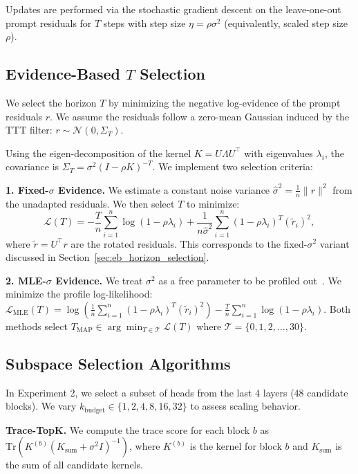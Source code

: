 \documentclass{article}
\theoremstyle{plain}
\theoremstyle{definition}
\theoremstyle{remark}
\begin{document}
Updates are performed via the stochastic gradient descent on the leave-one-out prompt residuals for $T$ steps with step size $\eta = \rho \sigma^2$ (equivalently, scaled step size $\rho$).

\subsection{Evidence-Based $T$ Selection}

We select the horizon $T$ by minimizing the negative log-evidence of the prompt residuals $r$. We assume the residuals follow a zero-mean Gaussian induced by the TTT filter: $r \sim \mathcal{N}(0, \Sigma_T)$.

Using the eigen-decomposition of the kernel $K = U \Lambda U^\top$ with eigenvalues $\lambda_i$, the covariance is $\Sigma_T = \sigma^2 (I - \rho K)^{-T}$. We implement two selection criteria:

\textbf{1. Fixed-$\sigma$ Evidence.} We estimate a constant noise variance $\hat{\sigma}^2 = \frac{1}{n}\|r\|^2$ from the unadapted residuals. We then select $T$ to minimize:
\begin{equation}
\mathcal{L}(T) = -\frac{T}{n} \sum_{i=1}^n \log(1 - \rho \lambda_i) + \frac{1}{n \hat{\sigma}^2} \sum_{i=1}^n (1 - \rho \lambda_i)^T (\tilde{r}_i)^2,
\end{equation}
where $\tilde{r} = U^\top r$ are the rotated residuals. This corresponds to the fixed-$\sigma^2$ variant discussed in Section~\ref{sec:eb_horizon_selection}.

\textbf{2. MLE-$\sigma$ Evidence.} We treat $\sigma^2$ as a free parameter to be profiled out~\citep{MurphyVanDerVaart2000Profile}. We minimize the profile log-likelihood: $\mathcal{L}_{\text{MLE}}(T) =
\log\left( \frac{1}{n} \sum_{i=1}^n (1 - \rho \lambda_i)^T (\tilde{r}_i)^2 \right)
- \frac{T}{n} \sum_{i=1}^n \log(1 - \rho \lambda_i)$. Both methods select $T_{\mathrm{MAP}} \in \arg\min_{T \in \mathcal{T}} \mathcal{L}(T)$ where $\mathcal{T} = \{0, 1, 2, \ldots, 30\}$.

\subsection{Subspace Selection Algorithms}

In Experiment 2, we select a subset of heads from the last 4 layers (48 candidate blocks). We vary $k_{\text{budget}} \in \{1, 2, 4, 8, 16, 32\}$ to assess scaling behavior.

\textbf{Trace-TopK.} We compute the trace score for each block $b$ as $\text{Tr}(K^{(b)} (K_{\text{sum}} + \sigma^2 I)^{-1})$, where $K^{(b)}$ is the kernel for block $b$ and $K_{\text{sum}}$ is the sum of all candidate kernels.
\end{document}
